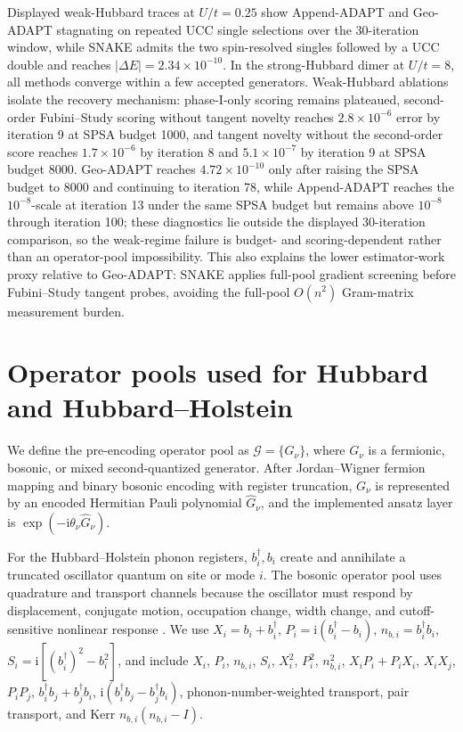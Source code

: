 \documentclass[
  reprint,
  amsmath,
  amssymb,
  aps,
  pra,
  nofootinbib,
  superscriptaddress,
  floatfix
]{revtex4-2}
\newcommand{\Gset}{\mathcal{G}}
\newcommand{\ii}{\mathrm{i}}
\begin{document}
Displayed weak-Hubbard traces at \(U/t=0.25\) show Append-ADAPT and Geo-ADAPT stagnating on repeated UCC single selections over the 30-iteration window, while SNAKE admits the two spin-resolved singles followed by a UCC double and reaches \(|\Delta E|=2.34\times10^{-10}\).
In the strong-Hubbard dimer at \(U/t=8\), all methods converge within a few accepted generators.
Weak-Hubbard ablations isolate the recovery mechanism: phase-I-only scoring remains plateaued, second-order Fubini--Study scoring without tangent novelty reaches \(2.8\times10^{-6}\) error by iteration 9 at SPSA budget 1000, and tangent novelty without the second-order score reaches \(1.7\times10^{-6}\) by iteration 8 and \(5.1\times10^{-7}\) by iteration 9 at SPSA budget 8000.
Geo-ADAPT reaches \(4.72\times10^{-10}\) only after raising the SPSA budget to 8000 and continuing to iteration 78, while Append-ADAPT reaches the \(10^{-8}\)-scale at iteration 13 under the same SPSA budget but remains above \(10^{-8}\) through iteration 100; these diagnostics lie outside the displayed 30-iteration comparison, so the weak-regime failure is budget- and scoring-dependent rather than an operator-pool impossibility.
This also explains the lower estimator-work proxy relative to Geo-ADAPT: SNAKE applies full-pool gradient screening before Fubini--Study tangent probes, avoiding the full-pool \(O(n^2)\) Gram-matrix measurement burden.


\section{Operator pools used for Hubbard and Hubbard--Holstein}
\label{app:pools}

We define the pre-encoding operator pool as \(\Gset=\{G_\nu\}\), where
\(G_\nu\) is a fermionic, bosonic, or mixed second-quantized generator.  After
Jordan--Wigner fermion mapping and binary bosonic encoding with register
truncation, \(G_\nu\) is represented by an encoded Hermitian Pauli polynomial
\(\widehat G_\nu\), and the implemented ansatz layer is
\(\exp(-\ii\theta_\nu\widehat G_\nu)\).

For the Hubbard--Holstein phonon registers, \(b_i^\dagger,b_i\) create and annihilate a truncated
oscillator quantum on site or mode \(i\).  The bosonic operator pool uses
quadrature and transport channels because the oscillator must respond by
displacement, conjugate motion, occupation change, width change, and
cutoff-sensitive nonlinear response
\cite{Sawaya2020,Li2023,Dutta2024BosonicChemistry,Peng2025BosonHamiltonians}.
We use \(X_i=b_i+b_i^\dagger\), \(P_i=\ii(b_i^\dagger-b_i)\),
\(n_{b,i}=b_i^\dagger b_i\), \(S_i=\ii[(b_i^\dagger)^2-b_i^2]\),
and include \(X_i\), \(P_i\), \(n_{b,i}\), \(S_i\), \(X_i^2\), \(P_i^2\),
\(n_{b,i}^2\), \(X_iP_i+P_iX_i\), \(X_iX_j\), \(P_iP_j\),
\(b_i^\dagger b_j+b_j^\dagger b_i\),
\(\ii(b_i^\dagger b_j-b_j^\dagger b_i)\), phonon-number-weighted transport,
pair transport, and Kerr \(n_{b,i}(n_{b,i}-I)\).
\end{document}
